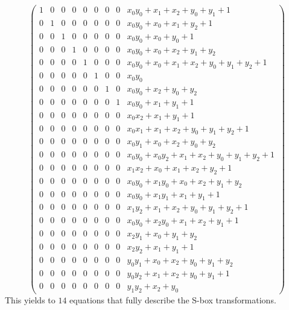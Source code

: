 \begin{equation}
    \label{eqn:sbox-equations}
    \left(
    \begin{array}{llllllllr}
        1 & 0 & 0 & 0 & 0 & 0 & 0 & 0 & x_0 y_0+ x_1+ x_2+ y_0+ y_1+ 1              \\
        0 & 1 & 0 & 0 & 0 & 0 & 0 & 0 & x_0 y_0+ x_0+ x_1+ y_2+ 1                   \\
        0 & 0 & 1 & 0 & 0 & 0 & 0 & 0 & x_0 y_0+ x_0+ y_0+ 1                        \\
        0 & 0 & 0 & 1 & 0 & 0 & 0 & 0 & x_0 y_0+ x_0+ x_2+ y_1+ y_2                 \\
        0 & 0 & 0 & 0 & 1 & 0 & 0 & 0 & x_0 y_0+ x_0+ x_1+ x_2+ y_0+ y_1+ y_2+ 1    \\
        0 & 0 & 0 & 0 & 0 & 1 & 0 & 0 & x_0 y_0                                     \\
        0 & 0 & 0 & 0 & 0 & 0 & 1 & 0 & x_0 y_0+ x_2+ y_0+ y_2                      \\
        0 & 0 & 0 & 0 & 0 & 0 & 0 & 1 & x_0 y_0+ x_1+ y_1+ 1                        \\
        0 & 0 & 0 & 0 & 0 & 0 & 0 & 0 & x_0 x_2+ x_1+ y_1+ 1                        \\
        0 & 0 & 0 & 0 & 0 & 0 & 0 & 0 & x_0 x_1+ x_1+ x_2+ y_0+ y_1+ y_2+ 1         \\
        0 & 0 & 0 & 0 & 0 & 0 & 0 & 0 & x_0 y_1+ x_0+ x_2+ y_0+ y_2                 \\
        0 & 0 & 0 & 0 & 0 & 0 & 0 & 0 & x_0 y_0+ x_0y_2+ x_1+ x_2+ y_0+ y_1+ y_2+ 1 \\
        0 & 0 & 0 & 0 & 0 & 0 & 0 & 0 & x_1 x_2+ x_0+ x_1+ x_2+ y_2+ 1              \\
        0 & 0 & 0 & 0 & 0 & 0 & 0 & 0 & x_0 y_0+ x_1y_0+ x_0+ x_2+ y_1+ y_2         \\
        0 & 0 & 0 & 0 & 0 & 0 & 0 & 0 & x_0 y_0+ x_1y_1+ x_1+ y_1+ 1                \\
        0 & 0 & 0 & 0 & 0 & 0 & 0 & 0 & x_1 y_2+ x_1+ x_2+ y_0+ y_1+ y_2+ 1         \\
        0 & 0 & 0 & 0 & 0 & 0 & 0 & 0 & x_0 y_0+ x_2y_0+ x_1+ x_2+ y_1+ 1           \\
        0 & 0 & 0 & 0 & 0 & 0 & 0 & 0 & x_2 y_1+ x_0+ y_1+ y_2                      \\
        0 & 0 & 0 & 0 & 0 & 0 & 0 & 0 & x_2 y_2+ x_1+ y_1+ 1                        \\
        0 & 0 & 0 & 0 & 0 & 0 & 0 & 0 & y_0 y_1+ x_0+ x_2+ y_0+ y_1+ y_2            \\
        0 & 0 & 0 & 0 & 0 & 0 & 0 & 0 & y_0 y_2+ x_1+ x_2+ y_0+ y_1+ 1              \\
        0 & 0 & 0 & 0 & 0 & 0 & 0 & 0 & y_1 y_2+ x_2+ y_0                            
    \end{array} \right)
\end{equation}
This yields to $14$ equations that fully describe the S-box transformations.  

